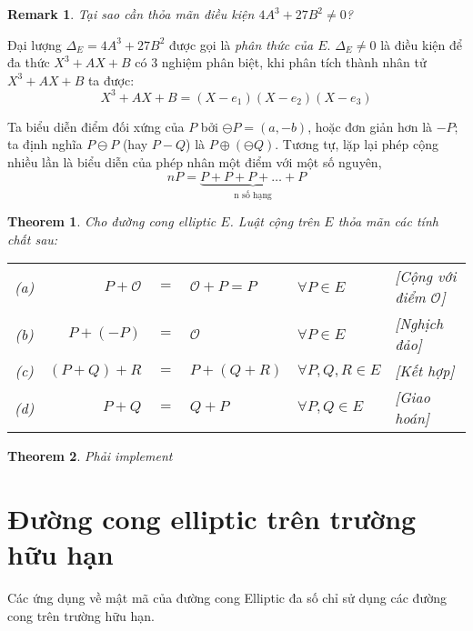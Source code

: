 \documentclass[12pt]{article}
\newtheorem{theorem}{Theorem}[section]
\newtheorem{remark}{Remark}
\begin{document}
\begin{remark}
    Tại sao cần thỏa mãn điều kiện $4A^3 + 27B^2 \neq 0$?
\end{remark}
Đại lượng $\Delta_E = 4A^3 + 27B^2$ được gọi là \textit{phân thức của $E$}.
$\Delta_E \neq 0$ là điều kiện để đa thức $X^3 + AX + B$ có 3 nghiệm phân biệt, khi phân tích thành nhân tử $X^3 + AX + B$
ta được:
$$X^3 + AX + B = (X-e_1)(X-e_2)(X-e_3)$$


Ta biểu diễn điểm đối xứng của $P$ bởi $\ominus P = (a,-b)$, hoặc đơn giản hơn là $-P$;
ta định nghĩa $P \ominus P$ (hay $P - Q$) là $P \oplus (\ominus Q)$.
Tương tự, lặp lại phép cộng nhiều lần là biểu diễn của phép nhân một điểm với một số nguyên,
$$nP = \underbrace{P + P + P + \ldots + P}_{\text{n số hạng}}$$

\begin{theorem}
    \label{th:th1}
    Cho đường cong elliptic $E$. Luật cộng trên $E$ thỏa mãn các tính chất sau:
    \begin{tabular}{crclll}
        (a) & $P + \mathcal{O}$ & $=$ & $\mathcal{O} + P = P$ & $\forall P \in E$     & [Cộng với điểm $\mathcal{O}$] \\
        (b) & $P + (-P)$        & $=$ & $\mathcal{O}$         & $\forall P \in E$     & [Nghịch đảo]                  \\
        (c) & $(P + Q) + R$     & $=$ & $P + (Q + R)$         & $\forall P,Q,R \in E$ & [Kết hợp]                     \\
        (d) & $P + Q$           & $=$ & $ Q + P$              & $\forall P,Q \in E$   & [Giao hoán]                   \\
    \end{tabular}
\end{theorem}

\begin{theorem}
    \label{th:th2}
    Phải implement
\end{theorem}


\section{Đường cong elliptic trên trường hữu hạn}
Các ứng dụng về mật mã của đường cong Elliptic đa số chỉ sử dụng các đường
cong trên trường hữu hạn.
\end{document}
